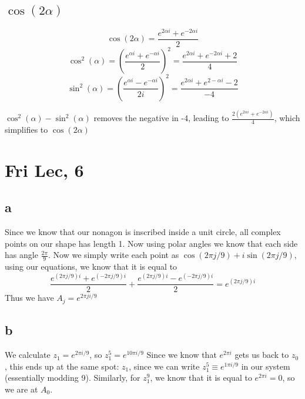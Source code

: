 \documentclass[12pt]{article}
\begin{document}
\subsection{$\cos(2\alpha)$}

$$\cos(2\alpha)=\frac{e^{2\alpha i}+e^{-2\alpha i}}{2}$$
$$\cos^2(\alpha)=(\frac{e^{\alpha i}+e^{-\alpha i}}{2})^2 =
\frac{e^{2\alpha i}+e^{-2\alpha i}+2}{4}$$
$$\sin^2(\alpha)=(\frac{e^{\alpha i}-e^{-\alpha i}}{2i})^2=
\frac{e^{2\alpha i}+e^{2-\alpha i}-2}{-4}$$

$\cos^2(\alpha)-\sin^2(\alpha)$ removes the negative in -4, leading to $\frac{2(e^{2\alpha i}+e^{-2\alpha i})}{4}$, which simplifies to $\cos(2\alpha)$


\section{Fri Lec, 6}
\subsection{a}
Since we know that our nonagon is inscribed inside a unit circle, all complex points on our shape has length 1. Now using polar angles we know that each side has angle $\frac{2\pi}{9}$. Now we simply write each point as $\cos(2\pi j/9)+i\sin(2\pi j/9)$, using our equations, we know that it is equal to
$$\frac{e^{(2\pi j/9 )i}+e^{(-2\pi j/9)i}}{2}+\frac{e^{(2\pi j/9) i}-e^{(-2\pi j/9) i}}{2} = e^{(2\pi j/9) i}$$
Thus we have $A_j =  e^{2\pi  j i/9 }$

\subsection{b}
We calculate $z_1 = e^{2\pi i/9 }$, so $z_1^5 = e^{10\pi i/9 }$ Since we know that $e^{2\pi i}$ gets us back to $z_0$, this ends up at the same spot: $z_1$, since we can write $z_1^5 \equiv e^{1\pi i/9 }$ in our system (essentially modding 9).
\newline
Similarly, for $z_1^9$, we know that it is equal to $e^{2\pi i}=0$, so we are at $A_0$.
\end{document}
